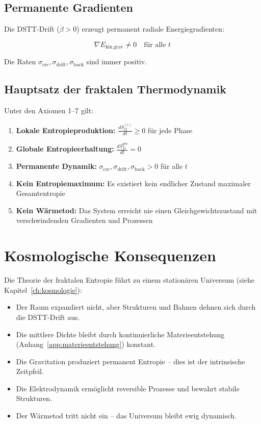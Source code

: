 \subsection{Permanente Gradienten}
\label{sub:fraktale_entropie_gradienten}

Die DSTT-Drift ($\dot{\beta} > 0$) erzeugt permanent radiale Energiegradienten:

\[
\nabla E_{\text{kin,grav}} \neq 0 \quad \text{für alle } t \tag{L.18}
\]

Die Raten $\sigma_{\text{cre}}, \sigma_{\text{drift}}, \sigma_{\text{back}}$ sind immer positiv.

\subsection{Hauptsatz der fraktalen Thermodynamik}
\label{sub:fraktale_entropie_hauptsatz}

Unter den Axiomen 1–7 gilt:

\begin{enumerate}
    \item \textbf{Lokale Entropieproduktion:} $\displaystyle \frac{dS_D^{(i)}}{dt} \geq 0$ für jede Phase
    \item \textbf{Globale Entropieerhaltung:} $\displaystyle \frac{dS_D^{\text{ges}}}{dt} = 0$
    \item \textbf{Permanente Dynamik:} $\sigma_{\text{cre}}, \sigma_{\text{drift}}, \sigma_{\text{back}} > 0$ für alle $t$
    \item \textbf{Kein Entropiemaximum:} Es existiert kein endlicher Zustand maximaler Gesamtentropie
    \item \textbf{Kein Wärmetod:} Das System erreicht nie einen Gleichgewichtszustand mit verschwindenden Gradienten und Prozessen
\end{enumerate}

\section{Kosmologische Konsequenzen}
\label{app:fraktale_entropie_kosmologie}

Die Theorie der fraktalen Entropie führt zu einem stationären Universum (siehe Kapitel~\ref{ch:kosmologie}):

\begin{itemize}
    \item Der Raum expandiert nicht, aber Strukturen und Bahnen dehnen sich durch die 
          DSTT-Drift aus.
    \item Die mittlere Dichte bleibt durch kontinuierliche Materieentstehung (Anhang~\ref{app:materieentstehung}) konstant.
    \item Die Gravitation produziert permanent Entropie – dies ist der intrinsische Zeitpfeil.
    \item Die Elektrodynamik ermöglicht reversible Prozesse und bewahrt stabile Strukturen.
    \item Der Wärmetod tritt nicht ein – das Universum bleibt ewig dynamisch.
\end{itemize}

